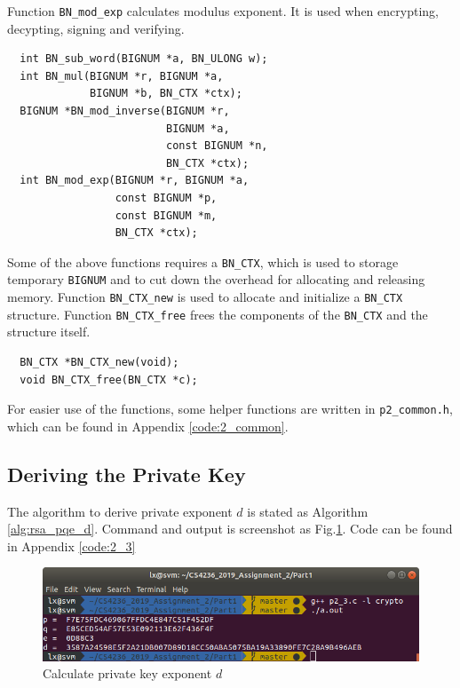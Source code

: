 Function \texttt{BN\_mod\_exp} calculates modulus exponent. It is used when encrypting, decypting, signing and verifying.
\begin{verbatim}
  int BN_sub_word(BIGNUM *a, BN_ULONG w);
  int BN_mul(BIGNUM *r, BIGNUM *a, 
             BIGNUM *b, BN_CTX *ctx);
  BIGNUM *BN_mod_inverse(BIGNUM *r, 
                         BIGNUM *a, 
                         const BIGNUM *n,
                         BN_CTX *ctx);
  int BN_mod_exp(BIGNUM *r, BIGNUM *a, 
                 const BIGNUM *p,
                 const BIGNUM *m, 
                 BN_CTX *ctx);
\end{verbatim}

Some of the above functions requires a \texttt{BN\_CTX}, which is used to storage temporary \texttt{BIGNUM} and to cut down the overhead for allocating and releasing memory.
Function \texttt{BN\_CTX\_new} is used to allocate and initialize a \texttt{BN\_CTX} structure.
Function \texttt{BN\_CTX\_free} frees the components of the \texttt{BN\_CTX} and the structure itself.
\begin{verbatim}
  BN_CTX *BN_CTX_new(void);
  void BN_CTX_free(BN_CTX *c);
\end{verbatim}

For easier use of the functions, some helper functions are written in \texttt{p2\_common.h}, which can be found in Appendix \ref{code:2_common}.

\subsection{Deriving the Private Key}

The algorithm to derive private exponent $d$ is stated as Algorithm \ref{alg:rsa_pqe_d}.
Command and output is screenshot as Fig.\ref{fig:p2_3}.
Code can be found in Appendix \ref{code:2_3}

\begin{figure}[b!]
\centering
\includegraphics[width=\columnwidth]{pictures/p2_3.png}
\caption{
    Calculate private key exponent $d$
}
\label{fig:p2_3}
\end{figure}

